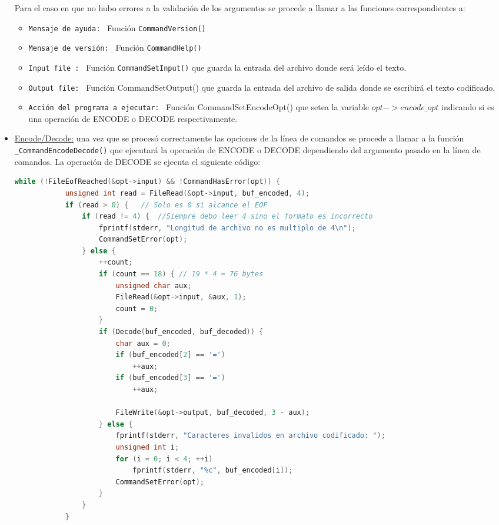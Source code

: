 \documentclass[10pt,a4paper]{article}
\begin{document}
\begin{itemize}
	Para el caso en que no hubo errores a la validación de los argumentos se procede a llamar a las funciones correspondientes a:
	\begin{itemize}
		\item \texttt{Mensaje de ayuda: } Función \texttt{CommandVersion()}
		\item \texttt{Mensaje de versión: } Función \texttt{CommandHelp()}
		\item \texttt{Input file : } Función \texttt{CommandSetInput()} que guarda la entrada del archivo donde será leído el texto. 
		\item \texttt{Output file: } Función {CommandSetOutput()} que guarda la entrada del archivo de salida donde se escribirá el texto codificado.
		\item \texttt{Acción del programa a ejecutar: } Función {CommandSetEncodeOpt()} que setea la variable $opt->encode\_opt$ indicando si es una operación de ENCODE o DECODE respectivamente.
\end{itemize}

	\item \underline{Encode/Decode:} una vez que se procesó correctamente las opciones de la línea de comandos se procede a llamar a la función \texttt{\_CommandEncodeDecode()} que ejecutará la operación de ENCODE o DECODE dependiendo del argumento pasado en la línea de comandos. 
La operación de DECODE se ejecuta el siguiente código:
\begin{lstlisting}[language=C]
while (!FileEofReached(&opt->input) && !CommandHasError(opt)) {
            unsigned int read = FileRead(&opt->input, buf_encoded, 4);
            if (read > 0) {   // Solo es 0 si alcance el EOF
                if (read != 4) {  //Siempre debo leer 4 sino el formato es incorrecto
                    fprintf(stderr, "Longitud de archivo no es multiplo de 4\n");
                    CommandSetError(opt);
                } else {
                    ++count;
                    if (count == 18) { // 19 * 4 = 76 bytes
                        unsigned char aux;
                        FileRead(&opt->input, &aux, 1);
                        count = 0;
                    }
                    if (Decode(buf_encoded, buf_decoded)) {
                        char aux = 0;
                        if (buf_encoded[2] == '=')
                            ++aux;
                        if (buf_encoded[3] == '=')
                            ++aux;

                        FileWrite(&opt->output, buf_decoded, 3 - aux);
                    } else {
                        fprintf(stderr, "Caracteres invalidos en archivo codificado: ");
                        unsigned int i;
                        for (i = 0; i < 4; ++i)
                            fprintf(stderr, "%c", buf_encoded[i]);
                        CommandSetError(opt);
                    }
                }
            }



\end{lstlisting}
\end{itemize}
\end{document}

